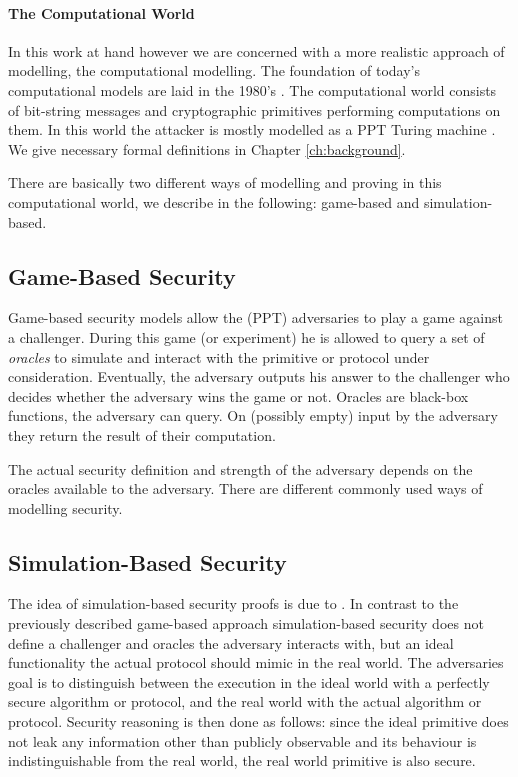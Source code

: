 \paragraph{The Computational World}
In this work at hand however we are concerned with a more realistic approach of modelling, the computational modelling.
The foundation of today's computational models are laid in the 1980's \cite{Goldwasser82}.
The computational world consists of bit-string messages and cryptographic primitives performing computations on them.
In this world the attacker is mostly modelled as a \ac{PPT} Turing machine \cite{Turing37}.
We give necessary formal definitions in Chapter \ref{ch:background}.

There are basically two different ways of modelling and proving in this computational world, we describe in the following: game-based and simulation-based.

\subsection{Game-Based Security}
Game-based security models allow the (\ac{PPT}) adversaries to play a game against a challenger.
During this game (or experiment) he is allowed to query a set of \emph{oracles} to simulate and interact with the primitive or protocol under consideration.
Eventually, the adversary outputs his answer to the challenger who decides whether the adversary wins the game or not.
Oracles are black-box functions, the adversary can query.
On (possibly empty) input by the adversary they return the result of their computation.

The actual security definition and strength of the adversary depends on the oracles available to the adversary.
There are different commonly used ways of modelling security.

\subsection{Simulation-Based Security}
The idea of simulation-based security proofs is due to \citeauthor{Goldreich87} \cite{Goldreich87} \citeyear{Goldreich87}.
In contrast to the previously described game-based approach simulation-based security does not define a challenger and oracles the adversary interacts with, but an ideal functionality the actual protocol should mimic in the real world.
The adversaries goal is to distinguish between the execution in the ideal world with a perfectly secure algorithm or protocol, and the real world with the actual algorithm or protocol.
Security reasoning is then done as follows: since the ideal primitive does not leak any information other than publicly observable and its behaviour is indistinguishable from the real world, the real world primitive is also secure.

